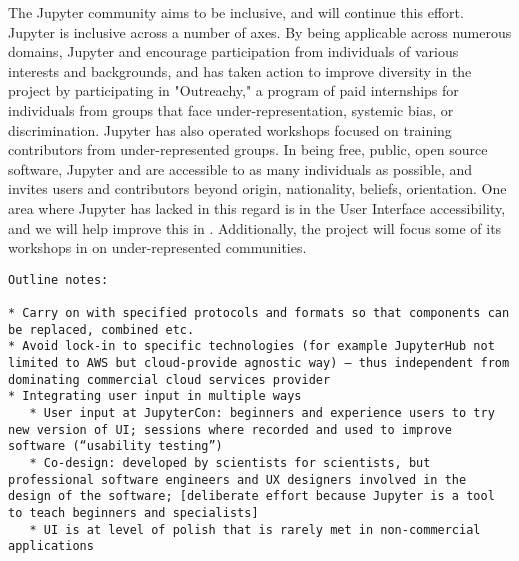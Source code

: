 The Jupyter community aims to be inclusive, and \TheProject will continue this effort.
Jupyter is inclusive across a number of axes.
By being applicable across numerous domains,
Jupyter and \TheProject encourage participation from individuals of various interests and backgrounds,
and has taken action to improve diversity in the project
by participating in "Outreachy," a program of paid internships
for individuals from groups that face under-representation, systemic bias, or discrimination.
Jupyter has also operated workshops focused on training contributors from under-represented groups.
In being free, public, open source software, Jupyter and \TheProject
are accessible to as many individuals as possible,
and invites users and contributors beyond origin, nationality, beliefs, orientation.
One area where Jupyter has lacked in this regard is in the User Interface accessibility,
and we will help improve this in .
Additionally, the project will focus some of its workshops in 
on under-represented communities.




\begin{verbatim}
Outline notes:

* Carry on with specified protocols and formats so that components can be replaced, combined etc.
* Avoid lock-in to specific technologies (for example JupyterHub not limited to AWS but cloud-provide agnostic way) – thus independent from dominating commercial cloud services provider
* Integrating user input in multiple ways
   * User input at JupyterCon: beginners and experience users to try new version of UI; sessions where recorded and used to improve software (“usability testing”)
   * Co-design: developed by scientists for scientists, but professional software engineers and UX designers involved in the design of the software; [deliberate effort because Jupyter is a tool to teach beginners and specialists]
   * UI is at level of polish that is rarely met in non-commercial applications
\end{verbatim}
